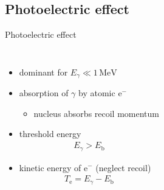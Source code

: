 \documentclass[11pt,xcolor=dvipsnames,professionalfonts]{beamer}
\begin{document}
\subsection{Photoelectric effect}

\begin{frame}{Photoelectric effect}
	\begin{columns}
		\begin{itemize}
			\setlength\itemsep{1.5em}
			\item dominant for $E_\gamma \ll 1 \, \mathrm{MeV}$
			
			\item absorption of $\gamma$ by atomic $\mathrm{e}^-$
			\begin{itemize}
				\item nucleus absorbs recoil momentum
			\end{itemize}
			
			\item threshold energy
			\begin{align*}
				E_\gamma > E_\mathrm{b}
			\end{align*}

			\item kinetic energy of $\mathrm{e}^-$ (neglect recoil)
			\begin{align*}
				T_\mathrm{e} = E_\gamma - E_\mathrm{b}
			\end{align*}
		\end{itemize}
		

\end{columns}
\end{frame}
\end{document}
